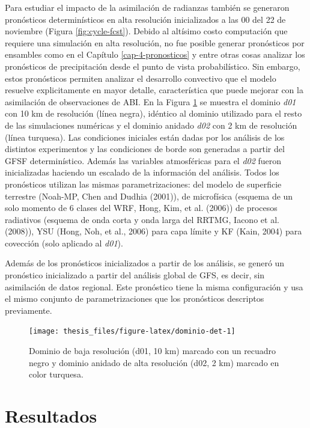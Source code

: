 \documentclass[12pt,oneside,a4paper]{reedthesis}
\begin{document}
Para estudiar el impacto de la asimilación de radianzas también se generaron pronósticos determinísticos en alta resolución inicializados a las 00 del 22 de noviembre (Figura \ref{fig:cycle-fcst}). Debido al altísimo costo computación que requiere una simulación en alta resolución, no fue posible generar pronósticos por ensambles como en el Capítulo \ref{cap-4-pronosticos} y entre otras cosas analizar los pronósticos de precipitación desde el punto de vista probabilístico. Sin embargo, estos pronósticos permiten analizar el desarrollo convectivo que el modelo resuelve explicitamente en mayor detalle, característica que puede mejorar con la asimilación de observaciones de ABI. En la Figura \ref{fig:dominio-det} se muestra el dominio \emph{d01} con 10 km de resolución (línea negra), idéntico al dominio utilizado para el resto de las simulaciones numéricas y el dominio anidado \emph{d02} con 2 km de resolución (línea turquesa). Las condiciones iniciales están dadas por los análisis de los distintos experimentos y las condiciones de borde son generadas a partir del GFSF determinístico. Además las variables atmosféricas para el \emph{d02} fueron inicializadas haciendo un escalado de la información del análisis. Todos los pronósticos utilizan las mismas parametrizaciones: del modelo de superficie terrestre (Noah-MP, Chen and Dudhia (2001)), de microfísica (esquema de un solo momento de 6 clases del WRF, Hong, Kim, et al. (2006)) de procesos radiativos (esquema de onda corta y onda larga del RRTMG, Iacono et al. (2008)), YSU (Hong, Noh, et al., 2006) para capa límite y KF (Kain, 2004) para covección (solo aplicado al \emph{d01}).

Además de los pronósticos inicializados a partir de los análisis, se generó un pronóstico inicializado a partir del análisis global de GFS, es decir, sin asimilación de datos regional. Este pronóstico tiene la misma configuración y usa el mismo conjunto de parametrizaciones que los pronósticos descriptos previamente.


\begin{figure}

{\centering \texttt{[image: thesis\_files/figure-latex/dominio-det-1]} 

}

\caption{Dominio de baja resolución (d01, 10 km) marcado con un recuadro negro y dominio anidado de alta resolución (d02, 2 km) marcado en color turquesa.}\label{fig:dominio-det}
\end{figure}
\hypertarget{resultados-2}{%
\section{Resultados}\label{resultados-2}}
\end{document}
